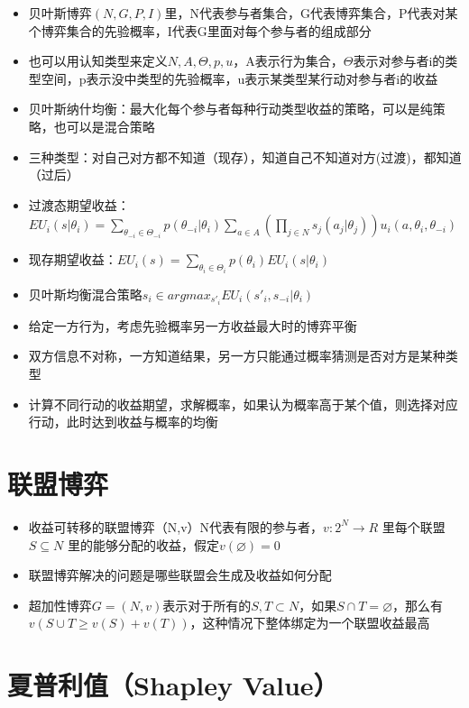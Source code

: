 \documentclass[]{book}
\providecommand{\tightlist}{%
  \setlength{\itemsep}{0pt}\setlength{\parskip}{0pt}}
\begin{document}
\begin{itemize}
\tightlist
\item
  贝叶斯博弈\((N,G,P,I)\)里，N代表参与者集合，G代表博弈集合，P代表对某个博弈集合的先验概率，I代表G里面对每个参与者的组成部分
\item
  也可以用认知类型来定义\(N,A,\Theta,p,u\)，A表示行为集合，\(\Theta\)表示对参与者i的类型空间，p表示没中类型的先验概率，u表示某类型某行动对参与者i的收益
\item
  贝叶斯纳什均衡：最大化每个参与者每种行动类型收益的策略，可以是纯策略，也可以是混合策略
\item
  三种类型：对自己对方都不知道（现存），知道自己不知道对方(过渡)，都知道（过后）
\item
  过渡态期望收益：\(EU_i(s|\theta_i) = \sum_{\theta_{-i}\in\Theta_{-i}}p(\theta_{-i}|\theta_i)\sum_{a\in A}(\prod_{j\in N}s_j(a_j|\theta_j))u_i(a,\theta_i,\theta_{-i})\)
\item
  现存期望收益：\(EU_i(s) = \sum_{\theta_i\in \Theta_i}p(\theta_i)EU_i(s|\theta_i)\)
\item
  贝叶斯均衡混合策略\(s_i\in arg max_{s'_i}EU_i(s'_i,s_{-i}|\theta_i)\)
\item
  给定一方行为，考虑先验概率另一方收益最大时的博弈平衡
\item
  双方信息不对称，一方知道结果，另一方只能通过概率猜测是否对方是某种类型
\item
  计算不同行动的收益期望，求解概率，如果认为概率高于某个值，则选择对应行动，此时达到收益与概率的均衡
\end{itemize}

\hypertarget{ux8054ux76dfux535aux5f08}{%
\section{联盟博弈}\label{ux8054ux76dfux535aux5f08}}

\begin{itemize}
\tightlist
\item
  收益可转移的联盟博弈（N,v）N代表有限的参与者，\(v:2^N \rightarrow R\) 里每个联盟 \(S\subseteq N\) 里的能够分配的收益，假定\(v(\varnothing)=0\)
\item
  联盟博弈解决的问题是哪些联盟会生成及收益如何分配
\item
  超加性博弈\(G=(N,v)\)表示对于所有的\(S,T\subset N\)，如果\(S\cap T = \varnothing\)，那么有\(v(S\cup T\geq v(S)+v(T))\)，这种情况下整体绑定为一个联盟收益最高
\end{itemize}

\hypertarget{ux590fux666eux5229ux503cshapley-value}{%
\section{夏普利值（Shapley Value）}\label{ux590fux666eux5229ux503cshapley-value}}
\end{document}
